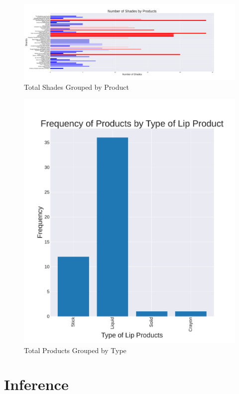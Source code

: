 \documentclass{article}
\begin{document}
\begin{center}
    \begin{landscape}
        \begin{figure}[htbp]
            \centering
            \includegraphics[scale=0.49]{../images/TotalShadesByProduct.pdf}
            \caption{Total Shades Grouped by Product}
            \label{Shades_by_Product}
        \end{figure}
    \end{landscape}
    
    \begin{figure}[htbp]
        \centering
        \includegraphics[scale=0.35]{../images/TotalProductsbyType.pdf}
        \caption{Total Products Grouped by Type}
        \label{Products_by_Type}
    \end{figure}
    \restoregeometry

\end{center}

\section{Inference}

\newpage



\newpage

\end{document}
